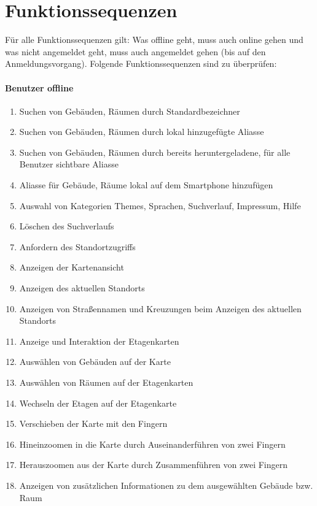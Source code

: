 \section{Funktionssequenzen}

Für alle Funktionssequenzen gilt: Was offline geht, muss auch online gehen und was nicht angemeldet geht, muss auch angemeldet gehen (bis auf den Anmeldungsvorgang).
Folgende Funktionssequenzen sind zu überprüfen:

\paragraph{Benutzer offline}
\begin{enumerate}[label=\textbf{/T\arabic*0/}, align=left]
	\item Suchen von Gebäuden, Räumen durch Standardbezeichner
	\item Suchen von Gebäuden, Räumen durch lokal hinzugefügte Aliasse
	\item Suchen von Gebäuden, Räumen durch bereits heruntergeladene, für alle Benutzer sichtbare Aliasse
	\item Aliasse für Gebäude, Räume lokal auf dem Smartphone hinzufügen
	\item Auswahl von Kategorien Themes, Sprachen, Suchverlauf, Impressum, Hilfe
	\item Löschen des Suchverlaufs
	\item Anfordern des Standortzugriffs
	\item Anzeigen der Kartenansicht
	\item Anzeigen des aktuellen Standorts
	\item Anzeigen von Straßennamen und Kreuzungen beim Anzeigen des aktuellen Standorts
	\item Anzeige und Interaktion der Etagenkarten
	\item Auswählen von Gebäuden auf der Karte
	\item Auswählen von Räumen auf der Etagenkarten
	\item Wechseln der Etagen auf der Etagenkarte
	\item Verschieben der Karte mit den Fingern
	\item Hineinzoomen in die Karte durch Auseinanderführen von zwei Fingern
	\item Herauszoomen aus der Karte durch Zusammenführen von zwei Fingern
	\item Anzeigen von zusätzlichen Informationen zu dem ausgewählten Gebäude bzw. Raum
\end{enumerate}

